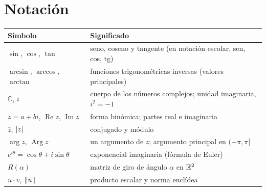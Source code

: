\documentclass[11pt,a4paper,twoside,openany]{book}
\newcommand{\C}{\mathbb{C}}
\newcommand{\Real}{\operatorname{Re}}
\newcommand{\Imag}{\operatorname{Im}}
\newcommand{\Arg}{\operatorname{Arg}}
\begin{document}
\section*{Notación}
\begin{center}
\begin{tabular}{@{}ll@{}}
\toprule
Símbolo & Significado \\
\midrule
$\sin$, $\cos$, $\tan$ & seno, coseno y tangente (en notación escolar, sen, cos, tg) \\
$\arcsin$, $\arccos$, $\arctan$ & funciones trigonométricas inversas (valores principales) \\
$\C$, $i$ & cuerpo de los números complejos; unidad imaginaria, $i^{2}=-1$ \\
$z=a+bi$, $\Real z$, $\Imag z$ & forma binómica; partes real e imaginaria \\
$\bar z$, $\lvert z\rvert$ & conjugado y módulo \\
$\arg z$, $\Arg z$ & un argumento de $z$; argumento principal en $(-\pi,\pi]$ \\
$e^{i\theta}=\cos\theta+i\sin\theta$ & exponencial imaginaria (fórmula de Euler) \\
$R(\alpha)$ & matriz de giro de ángulo $\alpha$ en $\mathbb{R}^{2}$ \\
$u\cdot v$, $\lVert u\rVert$ & producto escalar y norma euclídea \\
\bottomrule
\end{tabular}
\end{center}

\tableofcontents

\mainmatter







\appendix


\backmatter

\end{document}
